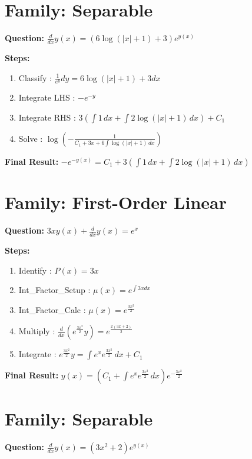 \documentclass{article}
\begin{document}
\section*{Family: Separable}
\textbf{Question:} $\frac{d}{d x} y{\left(x \right)} = \left(6 \log{\left(\left|{x}\right| + 1 \right)} + 3\right) e^{y{\left(x \right)}}$

\textbf{Steps:}
\begin{enumerate}
\item Classify :  $\frac{1}{e^{y}} dy = 6 \log{\left(\left|{x}\right| + 1 \right)} + 3 dx$
\item Integrate LHS :  $- e^{- y}$
\item Integrate RHS :  $3 \left(\int 1\, dx + \int 2 \log{\left(\left|{x}\right| + 1 \right)}\, dx\right) + C_1$
\item Solve :  $\log{\left(- \frac{1}{C_{1} + 3 x + 6 \int \log{\left(\left|{x}\right| + 1 \right)}\, dx} \right)}$
\end{enumerate}
\textbf{Final Result:} $- e^{- y{\left(x \right)}} = C_{1} + 3 \left(\int 1\, dx + \int 2 \log{\left(\left|{x}\right| + 1 \right)}\, dx\right)$

\section*{Family: First-Order Linear}
\textbf{Question:} $3 x y{\left(x \right)} + \frac{d}{d x} y{\left(x \right)} = e^{x}$

\textbf{Steps:}
\begin{enumerate}
\item Identify :  $P(x) = 3 x$
\item Int_Factor_Setup :  $\mu(x) = e^{\int 3 x dx}$
\item Int_Factor_Calc :  $\mu(x) = e^{\frac{3 x^{2}}{2}}$
\item Multiply :  $\frac{d}{dx}(e^{\frac{3 x^{2}}{2}}y) = e^{\frac{x \left(3 x + 2\right)}{2}}$
\item Integrate :  $e^{\frac{3 x^{2}}{2}}y = \int e^{x} e^{\frac{3 x^{2}}{2}}\, dx + C_1$
\end{enumerate}
\textbf{Final Result:} $y{\left(x \right)} = \left(C_{1} + \int e^{x} e^{\frac{3 x^{2}}{2}}\, dx\right) e^{- \frac{3 x^{2}}{2}}$

\section*{Family: Separable}
\textbf{Question:} $\frac{d}{d x} y{\left(x \right)} = \left(3 x^{2} + 2\right) e^{y{\left(x \right)}}$
\end{document}
